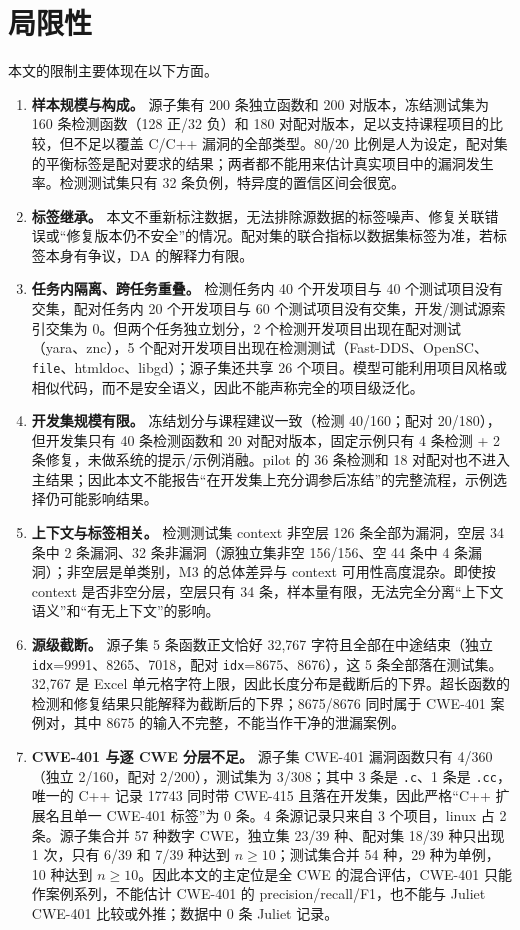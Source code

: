 \documentclass[conference]{IEEEtran}
\begin{document}
\section{局限性}
\label{sec:limitations}
本文的限制主要体现在以下方面。
\begin{enumerate}
    \item \textbf{样本规模与构成。} 源子集有 200 条独立函数和 200 对版本，冻结测试集为 160 条检测函数（128 正/32 负）和 180 对配对版本，足以支持课程项目的比较，但不足以覆盖 C/C++ 漏洞的全部类型。80/20 比例是人为设定，配对集的平衡标签是配对要求的结果；两者都不能用来估计真实项目中的漏洞发生率。检测测试集只有 32 条负例，特异度的置信区间会很宽。
    \item \textbf{标签继承。} 本文不重新标注数据，无法排除源数据的标签噪声、修复关联错误或“修复版本仍不安全”的情况。配对集的联合指标以数据集标签为准，若标签本身有争议，DA 的解释力有限。
    \item \textbf{任务内隔离、跨任务重叠。} 检测任务内 40 个开发项目与 40 个测试项目没有交集，配对任务内 20 个开发项目与 60 个测试项目没有交集，开发/测试源索引交集为 0。但两个任务独立划分，2 个检测开发项目出现在配对测试（yara、znc），5 个配对开发项目出现在检测测试（Fast-DDS、OpenSC、\texttt{file}、htmldoc、libgd）；源子集还共享 26 个项目。模型可能利用项目风格或相似代码，而不是安全语义，因此不能声称完全的项目级泛化。
    \item \textbf{开发集规模有限。} 冻结划分与课程建议一致（检测 40/160；配对 20/180），但开发集只有 40 条检测函数和 20 对配对版本，固定示例只有 4 条检测 + 2 条修复，未做系统的提示/示例消融。pilot 的 36 条检测和 18 对配对也不进入主结果；因此本文不能报告“在开发集上充分调参后冻结”的完整流程，示例选择仍可能影响结果。
    \item \textbf{上下文与标签相关。} 检测测试集 context 非空层 126 条全部为漏洞，空层 34 条中 2 条漏洞、32 条非漏洞（源独立集非空 156/156、空 44 条中 4 条漏洞）；非空层是单类别，M3 的总体差异与 context 可用性高度混杂。即使按 context 是否非空分层，空层只有 34 条，样本量有限，无法完全分离“上下文语义”和“有无上下文”的影响。
    \item \textbf{源级截断。} 源子集 5 条函数正文恰好 32{,}767 字符且全部在中途结束（独立 \texttt{idx}=9991、8265、7018，配对 \texttt{idx}=8675、8676），这 5 条全部落在测试集。32{,}767 是 Excel 单元格字符上限，因此长度分布是截断后的下界。超长函数的检测和修复结果只能解释为截断后的下界；8675/8676 同时属于 CWE-401 案例对，其中 8675 的输入不完整，不能当作干净的泄漏案例。
    \item \textbf{CWE-401 与逐 CWE 分层不足。} 源子集 CWE-401 漏洞函数只有 4/360（独立 2/160，配对 2/200），测试集为 3/308；其中 3 条是 \texttt{.c}、1 条是 \texttt{.cc}，唯一的 C++ 记录 17743 同时带 CWE-415 且落在开发集，因此严格“C++ 扩展名且单一 CWE-401 标签”为 0 条。4 条源记录只来自 3 个项目，linux 占 2 条。源子集合并 57 种数字 CWE，独立集 23/39 种、配对集 18/39 种只出现 1 次，只有 6/39 和 7/39 种达到 $n\ge 10$；测试集合并 54 种，29 种为单例，10 种达到 $n\ge 10$。因此本文的主定位是全 CWE 的混合评估，CWE-401 只能作案例系列，不能估计 CWE-401 的 precision/recall/F1，也不能与 Juliet CWE-401 比较或外推；数据中 0 条 Juliet 记录。

\end{enumerate}
\end{document}
